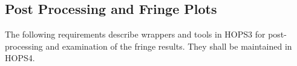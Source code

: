 \begin{description}


%

\end{description}



\subsection{Post Processing and Fringe Plots}
\label{sec:postprocreq}

The following requirements describe wrappers and tools in HOPS3 for
post-processing and examination of the fringe results. They shall be
maintained in HOPS4.


